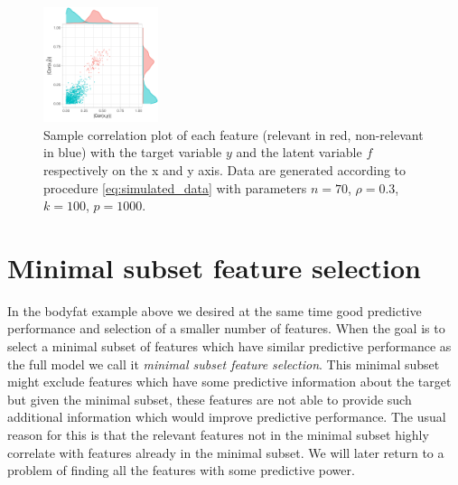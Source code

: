 \documentclass[american,]{article}
\theoremstyle{definition}
\begin{document}
\begin{figure}[tp]
  \centering
  \includegraphics[width=0.3\textwidth]{graphics/correlation.pdf}
  \caption{Sample correlation plot of each feature (relevant in red, 
  non-relevant in blue) with the target variable $y$ and the latent variable 
  $f$ respectively on the x and y axis. Data are generated according to 
  procedure \eqref{eq:simulated_data} with parameters $n=70$, $\rho=0.3$,
  $k=100$, $p=1000$.\\}
  \label{fig:correlation}
\end{figure}

\hypertarget{comparison-minimal-subset}{
\section{Minimal subset feature selection}\label{comparison-minimal-subset}}

In the bodyfat example above we desired at the same time good
predictive performance and selection of a smaller number of
features. When the goal is to select a minimal subset of features
which have similar predictive performance as the full model we call it
\emph{minimal subset feature selection}. This minimal subset might
exclude features which have some predictive information about the
target but given the minimal subset, these features are not able to
provide such additional information which would improve predictive
performance. The usual reason for this is that the relevant features
not in the minimal subset highly correlate with features already in
the minimal subset. We will later return to a problem of finding all
the features with some predictive power.
\end{document}
